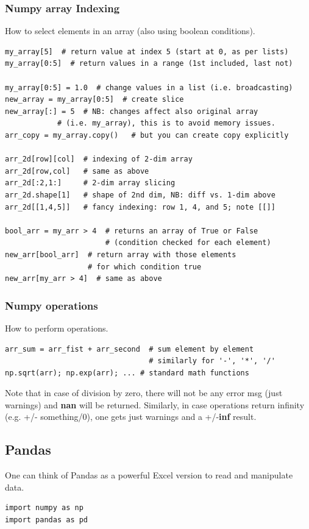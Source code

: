 \documentclass[12pt]{article}
\begin{document}
\subsubsection{Numpy array Indexing}
How to select elements in an array (also using boolean conditions).

\begin{lstlisting}
my_array[5]  # return value at index 5 (start at 0, as per lists)
my_array[0:5]  # return values in a range (1st included, last not)
 
my_array[0:5] = 1.0  # change values in a list (i.e. broadcasting)
new_array = my_array[0:5]  # create slice
new_array[:] = 5  # NB: changes affect also original array 
            # (i.e. my_array), this is to avoid memory issues.  
arr_copy = my_array.copy()   # but you can create copy explicitly 

arr_2d[row][col]  # indexing of 2-dim array
arr_2d[row,col]   # same as above
arr_2d[:2,1:]     # 2-dim array slicing
arr_2d.shape[1]   # shape of 2nd dim, NB: diff vs. 1-dim above
arr_2d[[1,4,5]]   # fancy indexing: row 1, 4, and 5; note [[]]

bool_arr = my_arr > 4  # returns an array of True or False 
                       # (condition checked for each element)
new_arr[bool_arr]  # return array with those elements 
                   # for which condition true
new_arr[my_arr > 4]  # same as above
\end{lstlisting}

\subsubsection{Numpy operations}
How to perform operations.
\begin{lstlisting}
arr_sum = arr_fist + arr_second  # sum element by element
                                 # similarly for '-', '*', '/'
np.sqrt(arr); np.exp(arr); ... # standard math functions
\end{lstlisting}
Note that in case of division by zero, there will not be any error msg (just warnings) and \textbf{nan} will be returned. Similarly, in case operations return infinity (e.g. +/- something/0), one gets just warnings and a +/-\textbf{inf} result.


\subsection{Pandas}
One can think of Pandas as a powerful Excel version to read and manipulate data.
\begin{lstlisting}
import numpy as np
import pandas as pd
\end{lstlisting}
\end{document}
